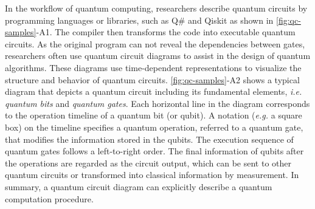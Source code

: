In the workflow of quantum computing\cite{Weder:2020:IQC}, researchers describe quantum circuits by programming languages or libraries, such as Q\#\cite{Svore:2018:QSharp} and Qiskit\cite{Qiskit} as shown in \cref{fig:qc-samples}-A1. The compiler then transforms the code into executable quantum circuits.
As the original program can not reveal the dependencies between gates,
researchers often use quantum circuit diagrams to assist in the design of quantum algorithms.
These diagrams use time-dependent representations to visualize the structure and behavior of quantum circuits.
{\cref{fig:qc-samples}}-A2 shows a typical diagram that depicts a quantum circuit including its fundamental elements, \emph{i.e.} \emph{quantum bits} and \emph{quantum gates}.
Each horizontal line in the diagram corresponds to the operation timeline of a quantum bit (or qubit).
A notation (\emph{e.g.} a square box) on the timeline specifies a quantum operation, referred to a quantum gate, that modifies the information stored in the qubits.
The execution sequence of quantum gates follows a left-to-right order.
The final information of qubits after the operations are regarded as the circuit output, which can be sent to other quantum circuits or transformed into classical information by measurement.
In summary, a quantum circuit diagram can explicitly describe a quantum computation procedure.

